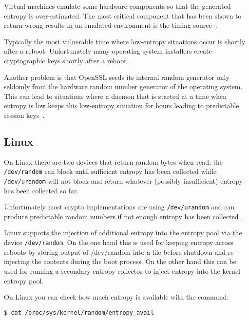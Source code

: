 Virtual machines emulate some hardware components so that the
generated entropy is over-estimated. The most critical component that
has been shown to return wrong results in an emulated environment is the
timing source~\cite{Eng11,POL11}.

Typically the most vulnerable time where low-entropy situations occur is
shortly after a reboot. Unfortunately many operating system installers
create cryptographic keys shortly after a reboot~\cite{HDWH12}.

Another problem is that OpenSSL seeds its internal random generator only
seldomly from the hardware random number generator of the operating
system. This can lead to situations where a daemon that is started at a
time when entropy is low keeps this low-entropy situation for hours
leading to predictable session keys~\cite{HDWH12}.

\subsection{Linux}
\label{subsec:RNG-linux}


On Linux there are two devices that return random bytes when read; the
\verb+/dev/random+ can block until sufficient entropy has been collected
while \verb+/dev/urandom+ will not block and return whatever (possibly
insufficient) entropy has been collected so far.

Unfortunately most crypto implementations are using \verb+/dev/urandom+
and can produce predictable random numbers if not enough entropy has
been collected~\cite{HDWH12}.

Linux supports the injection of additional entropy into the entropy pool
via the device \verb+/dev/random+. On the one hand this is used for
keeping entropy across reboots by storing output of /dev/random into a
file before shutdown and re-injecting the contents during the boot
process. On the other hand this can be used for running a secondary
entropy collector to inject entropy into the kernel entropy pool.

On Linux you can check how much entropy is available with the command:
\begin{lstlisting}
$ cat /proc/sys/kernel/random/entropy_avail
\end{lstlisting}




